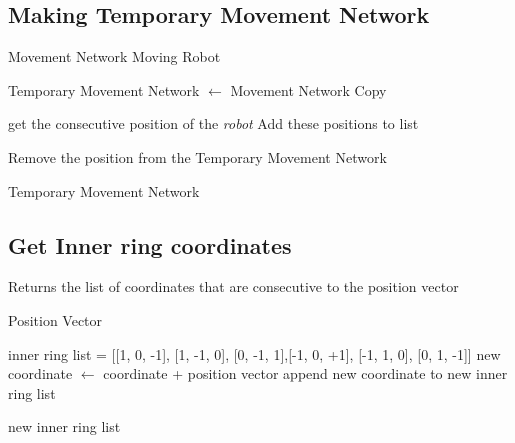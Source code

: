 \subsection{Making Temporary Movement Network}
\label{function:}
\begin{algorithm}
\caption{}
\begin{algorithmic}

\REQUIRE Movement Network
\REQUIRE Moving Robot

\STATE Temporary Movement Network $\leftarrow$ Movement Network Copy 

    \STATE get the consecutive position of the \textit{robot}
    \STATE Add these positions to list
    
       \STATE Remove the position from the Temporary Movement Network
\ENDFOR
\ENDFOR


\RETURN Temporary Movement Network

\end{algorithmic}
\end{algorithm}

\subsection{Get Inner ring coordinates}
\label{function:def_inner_ring}
\begin{algorithm}[H]
\caption{Returns the list of coordinates that are consecutive to the position vector}
\begin{algorithmic}

\REQUIRE Position Vector

inner ring list = [[1, 0, -1], [1, -1, 0], [0, -1, 1],[-1, 0, +1], [-1, 1, 0], [0, 1, -1]]
\STATE new coordinate $\leftarrow$ coordinate + position vector
\STATE append new coordinate to new inner ring list

\ENDFOR
\RETURN new inner ring list
\end{algorithmic}
\end{algorithm}


